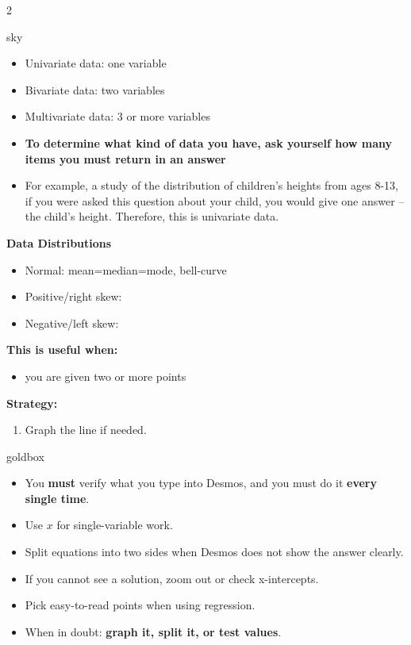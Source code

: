 \documentclass[10pt]{article}
\begin{document}
\begin{multicols}{2}
        \begin{skillbox}{sky}
            \begin{itemize}
                \item Univariate data: one variable
                \item Bivariate data: two variables
                \item Multivariate data: 3 or more variables
                \item \textbf{To determine what kind of data you have, ask yourself how many items you must return in an answer}
                \item For example, a study of the distribution of children's heights from ages 8-13, if you were asked this question about your child, you would give one answer -- the child's height.  Therefore, this is univariate data.
            \end{itemize}
            \textbf{Data Distributions}
            \begin{itemize}
                \item Normal:  mean=median=mode, bell-curve
                \item Positive/right skew:
                \item Negative/left skew:
            \end{itemize}

            \textbf{This is useful when:}
            \begin{itemize}
                \item you are given two or more points
            \end{itemize}

            \textbf{Strategy:}
            \begin{enumerate}
                \item Graph the line if needed.
            \end{enumerate}
        \end{skillbox}

        \begin{skillbox}{goldbox}
            \begin{itemize}
                \item You \textbf{must} verify what you type into Desmos, and you must do it \textbf{every single time}.
                \item Use \textbf{$x$} for single-variable work.
                \item Split equations into two sides when Desmos does not show the answer clearly.
                \item If you cannot see a solution, zoom out or check x-intercepts.
                \item Pick easy-to-read points when using regression.
                \item When in doubt: \textbf{graph it, split it, or test values}.
            \end{itemize}
        \end{skillbox}


\end{multicols}
\end{document}
